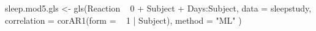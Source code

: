 \begin{Schunk}
\begin{Sinput}
 sleep.mod5.gls <- gls(Reaction ~ 0 + Subject + Days:Subject,
   data = sleepstudy,
   correlation = corAR1(form = ~ 1 | Subject), method = "ML"
 )
\end{Sinput}
\end{Schunk}
